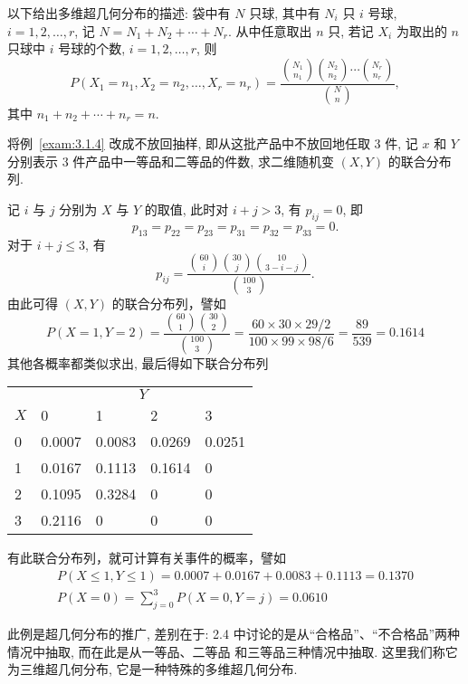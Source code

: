   以下给出多维超几何分布的描述: 袋中有 $N$ 只球, 其中有 $N_i$ 只 $i$ 号球, $i=1,2,\ldots,r$,
 记 $N=N_1+N_2+\cdots+N_r$. 从中任意取出 $n$ 只, 若记 $X_i$ 为取出的 $n$ 只球中 $i$ 号球的个数, $i=1,2,\ldots,r$, 则
 \begin{equation}\label{eq:3.1.6}
  	P(X_1=n_1,X_2=n_2,\ldots,X_r=n_r)=\frac	{\binom{N_1}{n_1}\binom{N_2}{n_2}\cdots\binom{N_r}{n_r}}{\binom{N}{n}},
 \end{equation}
 其中 $n_1+n_2+\cdots+n_r=n$.
 \begin{example}\label{exam:3.1.5}
 将例~\ref{exam:3.1.4} 改成不放回抽样, 即从这批产品中不放回地任取 3 件, 记 $x$ 和 $Y$ 分别表示 3 件产品中一等品和二等品的件数, 
 求二维随机变 $(X,Y)$ 的联合分布列. 
 \end{example}
 \begin{solution}
记 $i$ 与 $j$ 分别为 $X$ 与 $Y$ 的取值, 此时对 $i+j>3$, 有 $p_{ij}=0$, 即
\[
	p_{13}=p_{22}=p_{23}=p_{31}=p_{32}=p_{33}=0.
\]
对于 $i+j\leq 3$, 有
\[
	p_{ij}=\frac{\binom{60}{i}\binom{30}{j}\binom{10}{3-i-j}}{\binom{100}{3}}.
\]
由此可得 $(X,Y)$ 的联合分布列，譬如
\[
P(X=1, Y=2)=\frac{\binom{60}{1}\binom{30}{2}}{\binom{100}{3}}
=\frac{60 \times 30 \times 29 / 2}{100 \times 99 \times 98 / 6}=\frac{89}{539}=0.1614
\]
其他各概率都类似求出, 最后得如下联合分布列
\begin{center}
\begin{tabularx}{0.8\textwidth}{ZZZZZ}
\toprule
&	\\
$X$	&	0&	1&	2&	3		\\
	&	0.0007&	0.0083&	0.0269&	0.0251	\\
	&	0.0167&	0.1113&	0.1614&	0		\\
	&	0.1095&	0.3284&	0&		0		\\
	&	0.2116&	0&		0&		0		\\			
\bottomrule
\end{tabularx}
\end{center}
有此联合分布列，就可计算有关事件的概率，譬如
\[
\begin{gathered}
P(X \leq 1, Y \leq 1)=0.0007+0.0167+0.0083+0.1113=0.1370 \\
P(X=0)=\sum_{j=0}^{3} P(X=0, Y=j)=0.0610
\end{gathered}
\]
\end{solution}
 此例是超几何分布的推广, 差别在于: 2.4 中讨论的是从“合格品”、“不合格品”两种情况中抽取, 而在此是从一等品、二等品
 和三等品三种情况中抽取. 这里我们称它为三维超几何分布, 它是一种特殊的多维超几何分布. 

